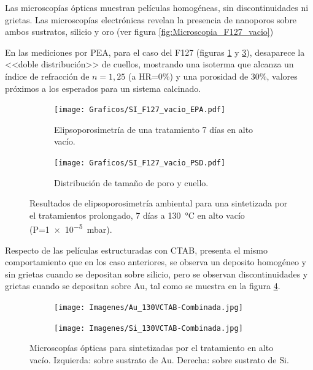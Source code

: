 {		\pagebreak

		Las microscopías ópticas muestran películas homogéneas, sin discontinuidades ni grietas. Las microscopías electrónicas revelan la presencia de nanoporos sobre ambos sustratos, silicio y oro (ver figura \ref{fig:Microscopia_F127_vacio}) 

		En las mediciones por PEA, para el caso del F127 (figuras \ref{fig:F127_vacio_EPA} y \ref{fig:F127_vacio_PSD}), desaparece la <<doble distribución>> de cuellos,  mostrando una isoterma que alcanza un índice de refracción de $n=1,25$ (a HR=0\%) y una porosidad de $30\%$, valores próximos a los esperados para un sistema calcinado.

		\begin{figure}[!ht]
			  	\begin{subfigure}[t]{0.495\textwidth}
			  	\texttt{[image: Graficos/SI\_F127\_vacio\_EPA.pdf]}
				\caption{Elipsoporosimetría de una \pdmF\space tratamiento 7 días en alto vacío.}
				\label{fig:F127_vacio_EPA}
				\end{subfigure}
				\begin{subfigure}[t]{0.495\textwidth}
			  	\texttt{[image: Graficos/SI\_F127\_vacio\_PSD.pdf]}
				\caption{Distribución de tamaño de poro y cuello.\\ }
				\label{fig:F127_vacio_PSD}
				\end{subfigure}
				\caption[Elipsoporosimetría \pdmF\space tratamiento alto vacío.]{Resultados de elipsoporosimetría ambiental para una \pdmF\space sintetizada por el tratamientos prolongado, 7 días a \SI{130}{\celsius} en alto vacío (P=\SI{1e-5}{\milli\bar}).}
				\end{figure}

		Respecto de las películas estructuradas con CTAB, presenta el mismo comportamiento que en los caso anteriores, se observa un deposito homogéneo y sin grietas cuando se depositan sobre silicio, pero se observan discontinuidades y grietas cuando se depositan sobre Au, tal como se muestra en la figura \ref{fig:Microscopia_CTAB_vacio}.
		
		\begin{figure}[!th]
		 	   	    \begin{subfigure}[t]{0.49\textwidth}
			       	\texttt{[image: Imagenes/Au\_130VCTAB-Combinada.jpg]}
			   		\end{subfigure}
			   		\begin{subfigure}[t]{0.49\textwidth}
			   	    \texttt{[image: Imagenes/Si\_130VCTAB-Combinada.jpg]}
			   		\end{subfigure}
					 \caption[Microscopía óptica \pdmC tratamiento vacío.]{Microscopías ópticas para \pdmC\space sintetizadas por el tratamiento en alto vacío. Izquierda: sobre sustrato de Au. Derecha: sobre sustrato de Si.}
					 \label{fig:Microscopia_CTAB_vacio}	
				     \end{figure}		     

}
